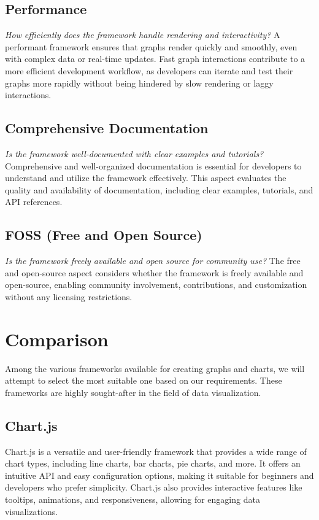 \documentclass[a4paper, 11pt]{article}
\begin{document}
    \subsection{Performance}
    \textit{How efficiently does the framework handle rendering and interactivity?}
    \smallbreak
    A performant framework ensures that graphs render quickly and smoothly, even with complex data or real-time updates. Fast graph interactions contribute to a more efficient development workflow, as developers can iterate and test their graphs more rapidly without being hindered by slow rendering or laggy interactions.
    \subsection{Comprehensive Documentation}
    \textit{Is the framework well-documented with clear examples and tutorials?}
    \smallbreak
    Comprehensive and well-organized documentation is essential for developers to understand and utilize the framework effectively. This aspect evaluates the quality and availability of documentation, including clear examples, tutorials, and API references.
    \subsection{FOSS (Free and Open Source)}
    \textit{Is the framework freely available and open source for community use?}
    \smallbreak
    The free and open-source aspect considers whether the framework is freely available and open-source, enabling community involvement, contributions, and customization without any licensing restrictions.
    \medbreak

    
    
\section{Comparison}

Among the various frameworks available for creating graphs and charts, we will attempt to select the most suitable one based on our requirements. These frameworks are highly sought-after in the field of data visualization.

\subsection{Chart.js}
Chart.js is a versatile and user-friendly framework that provides a wide range of chart types, including line charts, bar charts, pie charts, and more. It offers an intuitive API and easy configuration options, making it suitable for beginners and developers who prefer simplicity. Chart.js also provides interactive features like tooltips, animations, and responsiveness, allowing for engaging data visualizations.\par
\medbreak
\end{document}
